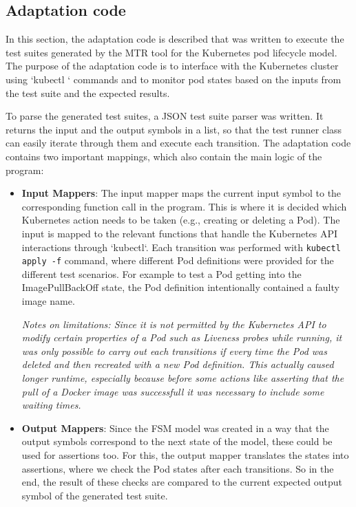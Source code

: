 \documentclass[main.tex]{subfiles}
\begin{document}
\subsection{Adaptation code}
In this section, the adaptation code is described that was written to execute the test suites generated by the MTR tool for the Kubernetes pod lifecycle model. The purpose of the adaptation code is to interface with the Kubernetes cluster using `kubectl ` commands and to monitor pod states based on the inputs from the test suite and the expected results.

To parse the generated test suites, a JSON test suite parser was written. It returns the input and the output symbols in a list, so that the test runner class can easily iterate through them and execute each transition. 
The adaptation code contains two important mappings, which also contain the main logic of the program:
\begin{itemize}
\item \textbf{Input Mappers}: The input mapper maps the current input symbol to the corresponding function call in the program. This is where it is decided which Kubernetes action needs to be taken (e.g., creating or deleting a Pod). The input is mapped to the relevant functions that handle the Kubernetes API interactions through `kubectl`. Each transition was performed with \texttt{kubectl apply -f} command, where different Pod definitions were provided for the different test scenarios. For example to test a Pod getting into the ImagePullBackOff state, the Pod definition intentionally contained a faulty image name. 

\textit{Notes on limitations: Since it is not permitted by the Kubernetes API to modify certain properties of a Pod such as Liveness probes while running, it was only possible to carry out each transitions if every time the Pod was deleted and then recreated with a new Pod definition. This actually caused longer runtime, especially because before some actions like asserting that the pull of a Docker image was successfull it was necessary to include some waiting times.} 

\item \textbf{Output Mappers}: Since the FSM model was created in a way that the output symbols correspond to the next state of the model, these could be used for assertions too. For this, the output mapper translates the states into assertions, where we check the Pod states after each transitions. So in the end, the result of these checks are compared to the current expected output symbol of the generated test suite.
\end{itemize}
\end{document}
